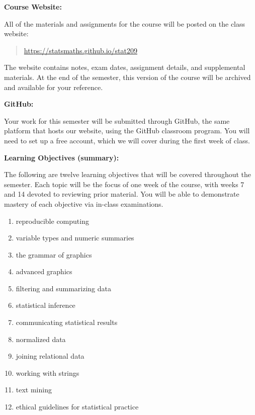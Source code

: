 \documentclass[12pt]{article}
\begin{document}
\bigskip

\textbf{Course Website:} \vspace{6pt}

All of the materials and assignments for the course will be posted
on the class website:
\begin{quote}
\url{https://statsmaths.github.io/stat209}
\end{quote}
The website contains notes, exam dates, assignment details, and
supplemental materials. At the end of the semester, this version of
the course will be archived and available for your reference.

\vspace{0.4cm}

\textbf{GitHub:} \vspace{6pt}

Your work for this semester will be submitted through GitHub,
the same platform that hosts our website, using the GitHub
classroom program. You will need to set up a free account, which
we will cover during the first week of class.

\newpage

\textbf{Learning Objectives (summary):} \vspace{6pt}

The following are twelve learning objectives that will be
covered throughout the semester. Each topic will be the
focus of one week of the course, with weeks 7 and 14 devoted
to reviewing prior material. You will be able to demonstrate
mastery of each objective via in-class examinations.

\begin{enumerate}\setlength\itemsep{0em}
\item reproducible computing
\item variable types and numeric summaries
\item the grammar of graphics
\item advanced graphics
\item filtering and summarizing data
\item statistical inference
\item communicating statistical results
\item normalized data
\item joining relational data
\item working with strings
\item text mining
\item ethical guidelines for statistical practice
\end{enumerate}
\end{document}
